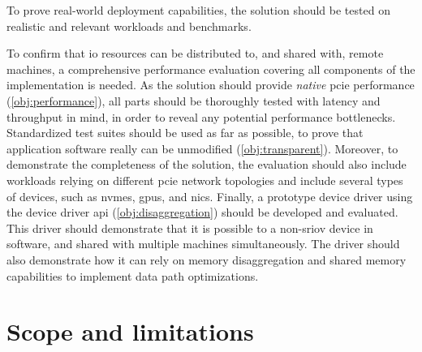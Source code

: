 \begin{objective}\label{obj:experiments}
    To prove real-world deployment capabilities, the solution should be tested on realistic and relevant workloads and benchmarks.
\end{objective}
To confirm that \gls{io} resources can be distributed to, and shared with, remote machines, a comprehensive performance evaluation covering all components of the implementation is needed.
As the solution should provide \emph{native} \gls{pcie} performance (\cref{obj:performance}), all parts should be thoroughly tested with latency and throughput in mind, in order to reveal any potential performance bottlenecks.
Standardized test suites should be used as far as possible, to prove that application software really can be unmodified (\cref{obj:transparent}).
%
Moreover, to demonstrate the completeness of the solution, the evaluation should also include workloads relying on different \gls{pcie} network topologies and include several types of devices, such as \glspl{nvme}, \glspl{gpu}, and \glspl{nic}.
%
Finally, a prototype device driver using the device driver \gls{api} (\cref{obj:disaggregation}) should be developed and evaluated. This driver should demonstrate that it is possible to  a non-\gls{sriov} device in software, and shared with multiple machines simultaneously. The driver should also demonstrate how it can rely on memory \gls{disaggregation} and shared memory capabilities to implement data path optimizations.



\section{Scope and limitations}




